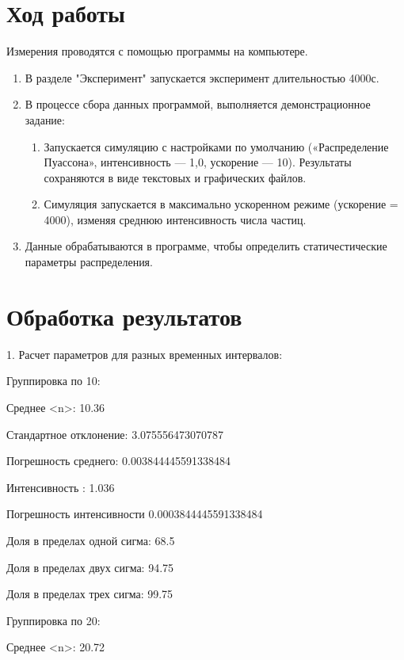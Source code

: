 \documentclass[12pt]{extarticle}
\begin{document}
\section{Ход работы}

Измерения проводятся с помощью программы на компьютере.

\begin{enumerate}
    \item В разделе "Эксперимент" запускается эксперимент длительностью 4000с.
    \item В процессе сбора данных программой, выполняется демонстрационное задание:
    \begin{enumerate}
        \item Запускается симуляцию с настройками по умолчанию («Распределение 
Пуассона», интенсивность — 1,0, ускорение — 10). Результаты сохраняются в виде текстовых
и графических файлов.
        \item Симуляция запускается в максимально ускоренном режиме (ускорение = 4000),
изменяя среднюю интенсивность числа частиц.
    \end{enumerate}
    \item Данные обрабатываются в программе, чтобы определить статичестические параметры распределения.
\end{enumerate} 

\section{Обработка результатов}

1. Расчет параметров для разных временных интервалов:

Группировка по 10:

 Среднее <n>: 10.36 

 Стандартное отклонение: 3.075556473070787 

 Погрешность среднего: 0.003844445591338484 

 Интенсивность : 1.036 

 Погрешность интенсивности 0.0003844445591338484

Доля в пределах одной сигма: 68.5%

Доля в пределах двух сигма: 94.75%

Доля в пределах трех сигма: 99.75%

\vspace{5mm}
Группировка по 20:

 Среднее <n>: 20.72 
\end{document}
